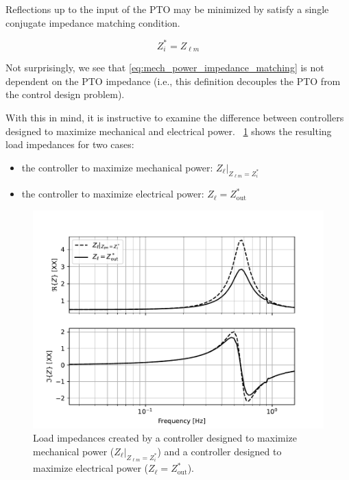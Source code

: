 \documentclass[lettersize,journal]{IEEEtran}
\begin{document}
Reflections up to the input of the PTO may be minimized by satisfy a single conjugate impedance matching condition.

\begin{equation}
        Z_i^* = Z_{\ell m}
        \label{eq:mech_power_impedance_matching}
\end{equation}

\noindent{}Not surprisingly, we see that \eqref{eq:mech_power_impedance_matching} is not dependent on the PTO impedance (i.e., this definition decouples the PTO from the control design problem).

With this in mind, it is instructive to examine the difference between controllers designed to maximize mechanical and electrical power.
\figurename~\ref{fig:wec_as_multiport_load_impedance_for_mech_power} shows the resulting load impedances for two cases:

\begin{itemize}
        \item the controller to maximize mechanical power: $Z_\ell \vert_{Z_{\ell m} = Z_i^*}$
        \item the controller to maximize electrical power: $Z_\ell = Z_{\mathrm{out}}^*$
\end{itemize}

\begin{figure}[tb]
        \centering
        \includegraphics[width=1\columnwidth]{wec_as_multiport_load_impedance_for_mech_power_real_imag.pdf}
        \caption{Load impedances created by a controller designed to maximize mechanical power ($Z_\ell \vert_{Z_{\ell m} = Z_i^*}$) and a controller designed to maximize electrical power ($Z_\ell = Z_{\mathrm{out}}^*$).}
        \label{fig:wec_as_multiport_load_impedance_for_mech_power}
\end{figure}
\end{document}
